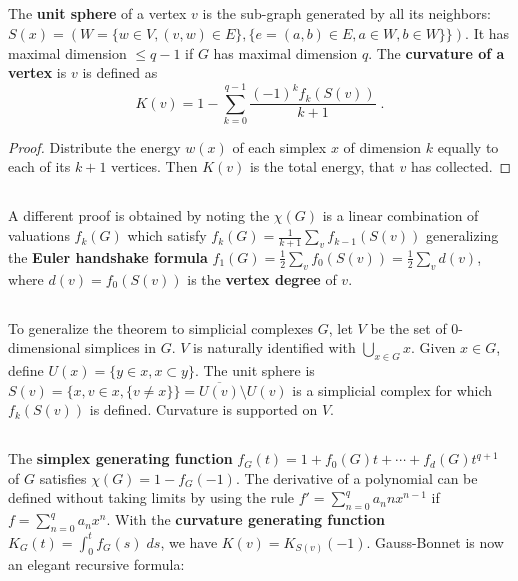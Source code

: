 \documentclass[12pt]{amsart}
\def\satz#1{ \vspace{1mm} \begin{center} \fcolorbox{black}{brightyellow}{ \parbox{15.2cm}{{\bf Theorem:} #1}} \vspace{1mm} \end{center} }
\let\paragraph\subsection
\begin{document}
\paragraph{}
The {\bf unit sphere} of a vertex $v$ is the sub-graph generated by all its neighbors:
$S(x) = (W=\{ w \in V, (v,w) \in E \}, \{ e=(a,b) \in E, a \in W, b \in W \} \})$. It
has maximal dimension $\leq q-1$ if $G$ has maximal dimension $q$.
The {\bf curvature of a vertex} is $v$ is defined as 
$$  K(v) = 1-\sum_{k=0}^{q-1} \frac{ (-1)^{k} f_k(S(v))}{k+1} \; . $$

\satz{
$\chi(G)=\sum_{v \in V} K(v)$. 
}
\begin{proof}
Distribute the energy $w(x)$ of each simplex $x$ of dimension $k$ equally 
to each of its $k+1$ vertices. Then $K(v)$ is the total energy, that $v$ has collected. 
\end{proof} 

\paragraph{}
A different proof is obtained by noting the $\chi(G)$ is a linear combination
of valuations $f_k(G)$ which satisfy $f_k(G) = \frac{1}{k+1} \sum_{v} f_{k-1}(S(v))$
generalizing the {\bf Euler handshake formula} $f_1(G) = \frac{1}{2} \sum_v f_0(S(v)) = \frac{1}{2} \sum_v d(v)$,
where $d(v)=f_0(S(v))$ is the {\bf vertex degree} of $v$.

\paragraph{}
To generalize the theorem to simplicial complexes $G$, let $V$ be the set of $0$-dimensional simplices in $G$.
$V$ is naturally identified with $\bigcup_{x \in G} x$. Given $x \in G$, define $U(x)=\{ y \in x, x \subset y\}$.
The unit sphere is $S(v) = \{ x, v \in x, \{v \neq x\} \}= \overline{U(v)}\setminus  U(v)$
is a simplicial complex for which $f_k(S(v))$ is defined. Curvature is supported on $V$.

\paragraph{}
The {\bf simplex generating function} $f_G(t)=1+f_0(G) t + \cdots + f_d(G) t^{q+1}$ 
of $G$ satisfies $\chi(G)=1-f_G(-1)$.
The derivative of a polynomial can be defined without taking limits by
using the rule $f'=\sum_{n=0}^q a_n n x^{n-1}$ if $f=\sum_{n=0}^q a_n x^n$.
With the {\bf curvature generating function} $K_G(t) = \int_0^t f_G(s) \; ds$, 
we have $K(v)=K_{S(v)}(-1)$. Gauss-Bonnet is now an elegant recursive formula:
\end{document}
